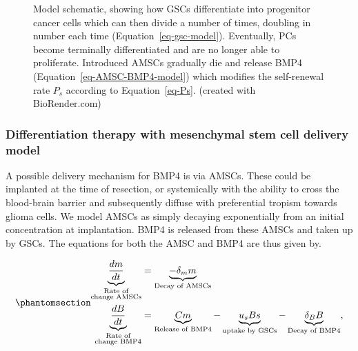 \documentclass[
  default,
]{sn-jnl}
\begin{document}
\begin{figure}


\caption{\label{fig-model_schematic}Model schematic, showing how GSCs
differentiate into progenitor cancer cells which can then divide a
number of times, doubling in number each time
(Equation~\ref{eq-gsc-model}). Eventually, PCs become terminally
differentiated and are no longer able to proliferate. Introduced AMSCs
gradually die and release BMP4 (Equation~\ref{eq-AMSC-BMP4-model}) which
modifies the self-renewal rate \(P_s\) according to
Equation~\ref{eq-Ps}. (created with BioRender.com)}

\end{figure}%

\subsubsection{Differentiation therapy with mesenchymal stem cell
delivery model}\label{sec-differentiation-therapy}

A possible delivery mechanism for BMP4 is via AMSCs. These could be
implanted at the time of resection, or systemically with the ability to
cross the blood-brain barrier and subsequently diffuse with preferential
tropism towards glioma cells. We model AMSCs as simply decaying
exponentially from an initial concentration at implantation. BMP4 is
released from these AMSCs and taken up by GSCs. The equations for both
the AMSC and BMP4 are thus given by.

\begin{equation}\phantomsection\label{eq-AMSC-BMP4-model}{
\begin{aligned}
    \underbrace{\frac{d m}{d t}}_{
    \substack{\text{Rate of} \\ \text{change AMSCs}}} &= \underbrace{-\delta_m m}_\text{Decay of AMSCs} \\ 
    \underbrace{\frac{d B}{d t}}_{
    \substack{\text{Rate of} \\ \text{change BMP4}}} &=  \underbrace{C m}_\text{Release of BMP4} - \underbrace{u_sBs}_\text{uptake by GSCs} - \underbrace{\delta_B B}_\text{Decay of BMP4}, 
\end{aligned} 
}\end{equation}
\end{document}
